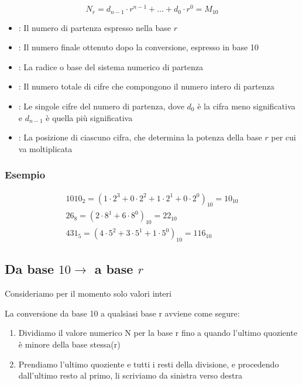 \begin{tcolorbox}[title ={Base r $\rightarrow$} Base 10]
    {\LARGE
        $$
        N_r = d_{n-1} \cdot r^{n-1} + \dots + d_0 \cdot r^0 = M_{10}
        $$
    }
    \begin{itemize}
        \item [$N_r$]: Il numero di partenza espresso nella base $r$
        \item [$M_{10}$]: Il numero finale ottenuto dopo la conversione, espresso in base 10
        \item [$r$]: La radice o base del sistema numerico di partenza
        \item [$n$]: Il numero totale di cifre che compongono il numero intero di partenza
        \item [$d_i$]: Le singole cifre del numero di partenza, dove $d_0$ è la cifra meno significativa e $d_{n-1}$ è quella più significativa
        \item [$i$]: La posizione di ciascuno cifra, che determina la potenza della base $r$ per cui va moltiplicata
    \end{itemize}
    \subsubsection{Esempio}
    \begin{gather*}
        1010_2 = (1 \cdot 2^3 + 0 \cdot 2^2 + 1 \cdot 2^1 + 0 \cdot 2^0)_{10} = 10_{10} \\[1ex]
        26_8 = (2 \cdot 8^1 + 6 \cdot 8^0)_{10} = 22_{10} \\[1ex]
        431_5 = (4 \cdot 5^2 + 3 \cdot 5^1 + 1 \cdot 5^0)_{10} = 116_{10}
    \end{gather*}
\end{tcolorbox}

\subsection{Da base $10 \rightarrow$ a base $r$}
Consideriamo per il momento solo valori interi

La conversione da base 10 a qualsiasi base r avviene come segure:
\begin{enumerate}
    \item Dividiamo il valore numerico N per la base r fino a quando l'ultimo quoziente è minore della base stessa(r)
    \item Prendiamo l'ultimo quoziente e tutti i resti della divisione, e procedendo dall'ultimo resto al primo, li scriviamo da sinistra verso destra
\end{enumerate}

